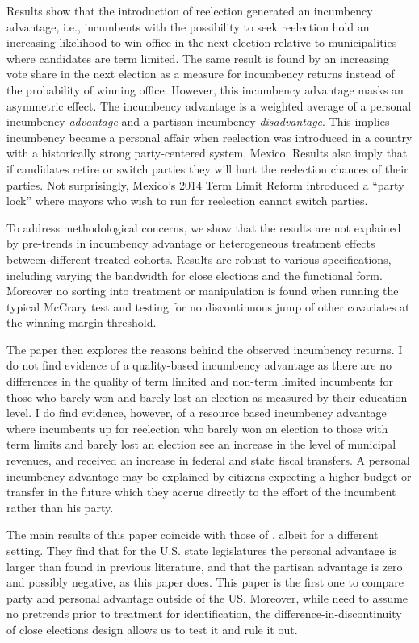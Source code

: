 \documentclass[12pt]{amsart}
\numberwithin{equation}{section}
\theoremstyle{definition}
\theoremstyle{definition}
\theoremstyle{definition}
\begin{document}
Results show that the introduction of reelection generated an incumbency advantage, i.e., incumbents with the possibility to seek reelection hold an increasing likelihood to win office in the next election relative to municipalities where candidates are term limited. The same result is found by an increasing vote share in the next election as a measure for incumbency returns instead of the probability of winning office. However, this incumbency advantage masks an asymmetric effect. The incumbency advantage is a weighted average of a personal incumbency \emph{advantage} and a partisan incumbency \emph{disadvantage}. This implies incumbency became a personal affair when reelection was introduced in a country with a historically strong party-centered system, Mexico. Results also imply that if candidates retire or switch parties they will hurt the reelection chances of their parties. Not surprisingly, Mexico's 2014 Term Limit Reform introduced a ``party lock'' where mayors who wish to run for reelection cannot switch parties.  

To address  methodological concerns, we show that the results are not explained by pre-trends in incumbency advantage or heterogeneous treatment effects between different treated cohorts. Results are robust to various specifications, including varying the bandwidth for close elections and the functional form. Moreover no sorting into treatment or manipulation is found when running the typical McCrary test and testing for no discontinuous jump of other covariates at the winning margin threshold. 

The paper then explores the reasons behind the observed incumbency returns. I do not find evidence of a quality-based incumbency advantage as there are no differences in the quality of term limited and non-term limited incumbents for those who barely won and barely lost an election as measured by their education level. I do find evidence, however, of a resource based incumbency advantage where incumbents up for reelection who barely won an election to those with term limits and barely lost an election see an increase in the level of municipal revenues, and received an increase in federal and state fiscal transfers. A personal incumbency advantage may be explained by citizens expecting a higher budget or transfer in the future which they accrue directly to the effort of the incumbent rather than his party.

The main results of this paper coincide with those of \citet{fowler_hall_2014}, albeit for a different setting. They find that for the U.S. state legislatures the personal advantage is larger than found in previous literature, and that the partisan advantage is zero and possibly negative, as this paper does. This paper is the first one to compare party and personal advantage outside of the US. Moreover, while \citet{fowler_hall_2014} need to assume no pretrends prior to treatment for identification, the difference-in-discontinuity of close elections design allows us to test it and rule it out. 
\end{document}
